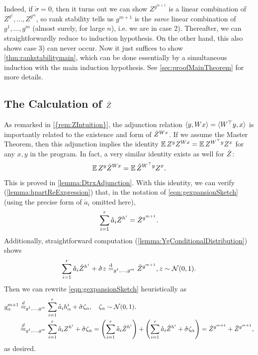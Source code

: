 \documentclass[main.tex]{subfiles}
\begin{document}
Indeed, if $\mathring{\sigma}=0$, then it turns out we can show $Z^{g^{m+1}}$ is a linear combination of $Z^{g^{1}},\ldots,Z^{g^{m}}$, so rank stability tells us $g^{m+1}$ is the \emph{same} linear combination of $g^{1},\ldots,g^{m}$ (almost surely, for large $n$), i.e. we are in case 2). Thereafter, we can straightforwardly reduce to induction hypothesis. On the other hand, this also shows case 3) can never occur. Now it just suffices to show \cref{thm:rankstabilitymain}, which can be done essentially by a simultaneous induction with the main induction hypothesis. See \cref{sec:proofMainTheorem} for more details.

\subsection{The Calculation of \texorpdfstring{$\dot Z$}{Zdot}}
\label{sec:Zdot}

As remarked in \cref{{rem:ZIntuition}}, the adjunction relation $\langle y,Wx\rangle=\langle W^{\top}y,x\rangle$ is importantly related to the existence and form of $\dot Z^{Wx}$. If we assume the Master Theorem, then this adjunction implies the identity $\operatorname*{\mathbb{E}} Z^{y}Z^{Wx}=\operatorname*{\mathbb{E}} Z^{W^{\top}y}Z^{x}$ for any $x,y$ in the program. In fact, a very similar identity exists as well for $\dot Z$:
\[
\operatorname*{\mathbb{E}} Z^{y}\dot Z^{Wx}=\operatorname*{\mathbb{E}}\hat{Z}^{W^{\top}y}Z^{x}.
\]
This is proved in \cref{lemma:DtrxAdjunction}.
With this identity, we can verify (\cref{lemma:hpartReExpression}) that, in the notation of \cref{eqn:gexpansionSketch} (using the precise form of $\mathring a_i$ omitted here),
\[
\sum_{i=1}^{r}\mathring{a}_{i}\dot Z^{h^{i}}=\dot Z^{g^{m+1}}.
\]
Additionally, straightforward computation (\cref{lemma:YgConditionalDistribution}) shows
\[
\sum_{i=1}^{r}\mathring{a}_{i}\hat{Z}^{h^{i}}+\mathring{\sigma}z\overset{\mathrm{d}}{=}_{g^1, \ldots, g^m}\hat{Z}^{g^{m+1}},z\sim\mathcal{N}(0,1).
\]
Then we can rewrite \cref{eqn:gexpansionSketch} heuristically as
\begin{align*}
    g_{\alpha}^{m+1}
    &\overset{d}{\approx}_{g^{1},\ldots,g^{m}}
        \sum_{i=1}^{r}\mathring{a}_{i}h_{\alpha}^{i}+\mathring{\sigma}\zeta_{\alpha},\quad\zeta_{\alpha}\sim\mathcal{N}(0,1).
        \\
    &\overset{d}{\approx}_{g^{1},\ldots,g^{m}}
        \sum_{i=1}^{r}\mathring{a}_{i}Z^{h^i}+\mathring{\sigma}\zeta_{\alpha}
    =
        \left( \sum_{i=1}^{r}\mathring{a}_{i}\dot Z^{h^i}\right) + \left( \sum_{i=1}^{r}\mathring{a}_{i}\hat Z^{h^i}+\mathring{\sigma}\zeta_{\alpha}\right)
    =
        \dot Z^{g^{m+1}} + \hat Z^{g^{m+1}},
\end{align*}
as desired.
\end{document}

